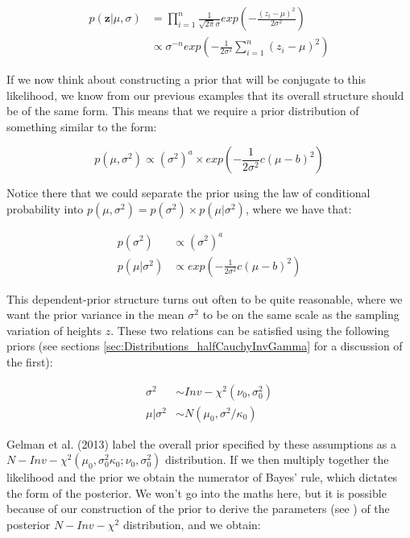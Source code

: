 \documentclass[11pt,fullpage]{book}
\begin{document}
\begin{align}
p(\boldsymbol{z}|\mu,\sigma) &= \prod\limits_{i=1}^{n}\frac{1}{\sqrt{2\pi} \sigma} exp\left(-\frac{(z_i-\mu)^2}{2\sigma^2}\right)\\
&\propto \sigma^{-n} exp\left(-\frac{1}{2\sigma^2}\sum\limits_{i=1}^{n}(z_i-\mu)^2 \right)
\end{align}

If we now think about constructing a prior that will be conjugate to this likelihood, we know from our previous examples that its overall structure should be of the same form. This means that we require a prior distribution of something similar to the form:

\begin{equation}
p(\mu,\sigma^2) \propto (\sigma^2)^a \times exp\left(-\frac{1}{2\sigma^2} c(\mu-b)^2 \right) 
\end{equation}

Notice there that we could separate the prior using the law of conditional probability into $p(\mu,\sigma^2) = p(\sigma^2)\times p(\mu|\sigma^2)$, where we have that:

\begin{align}
p(\sigma^2) &\propto (\sigma^2)^a\\
p(\mu|\sigma^2) &\propto exp\left(-\frac{1}{2\sigma^2} c(\mu-b)^2 \right)
\end{align}

This dependent-prior structure turns out often to be quite reasonable, where we want the prior variance in the mean $\sigma^2$ to be on the same scale as the sampling variation of heights $z$. These two relations can be satisfied using the following priors \cite{gelman2013bayesian} (see sections \ref{sec:Distributions_halfCauchyInvGamma} for a discussion of the first):

\begin{align}
\sigma^2 &\sim Inv-\chi^2(\nu_0,\sigma_0^2)\\
\mu|\sigma^2 &\sim N(\mu_0,\sigma^2/\kappa_0)
\end{align}

Gelman et al. (2013) label the overall prior specified by these assumptions as a $N-Inv-\chi^2(\mu_0,\sigma_0^2\kappa_0;\nu_0,\sigma_0^2)$ distribution. If we then multiply together the likelihood and the prior we obtain the numerator of Bayes' rule, which dictates the form of the posterior. We won't go into the maths here, but it is possible because of our construction of the prior to derive the parameters (see \cite{gelman2013bayesian}) of the posterior $N-Inv-\chi^2$ distribution, and we obtain:
\end{document}
